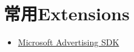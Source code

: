 \chapter{常用Extensions}

\begin{itemize}
	\item \href{https://marketplace.visualstudio.com/items?itemName=AdMediator.MicrosoftAdvertisingSDK}{Microsoft Advertising SDK }
\end{itemize}